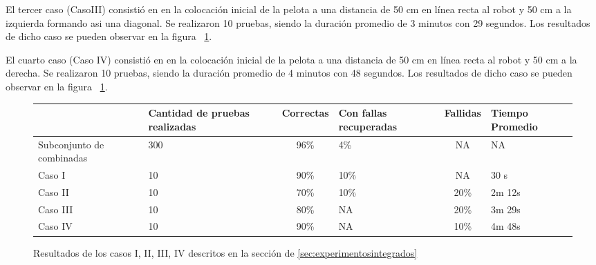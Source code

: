 El tercer caso  (CasoIII) consistió en en la colocación inicial de la pelota a una distancia de 50 cm en línea recta al robot y 50 cm a la izquierda formando asi una diagonal. Se realizaron 10 pruebas, siendo la duración promedio de 3 minutos con 29 segundos. Los resultados de dicho caso se pueden observar en la figura ~\ref{fig:casos}. 


El cuarto caso (Caso IV) consistió en en la colocación inicial de la pelota a una distancia de 50 cm en línea recta al robot y 50 cm a la derecha. Se realizaron 10 pruebas, siendo la duración promedio de 4 minutos con 48 segundos. Los resultados de dicho caso se pueden observar en la figura ~\ref{fig:casos}. 

\begin{figure}
\centering

\begin{tabular}{|p{3cm}|p{2cm}|c|p{2cm}|c|p{2cm}|}
\hline 
& Cantidad de 
pruebas realizadas & Correctas & Con fallas recuperadas & Fallidas & Tiempo Promedio \\ 
\hline 
Subconjunto de combinadas & 300 & 96\% & 4\% & NA & NA \\ 
\hline 
Caso I & 10 & 90\% & 10\% & NA & 30 s \\ 
\hline 
Caso II & 10 & 70\% & 10\% & 20\% & 2m 12s \\ 
\hline 
Caso III & 10 & 80\% & NA & 20\% & 3m 29s \\ 
\hline 
Caso IV & 10 & 90\% & NA & 10\% & 4m 48s \\ 
\hline 
\end{tabular} 

\caption{Resultados de los casos I, II, III, IV descritos en la secci\'on de \ref{sec:experimentosintegrados}}
\label{fig:casos}

\end{figure}

